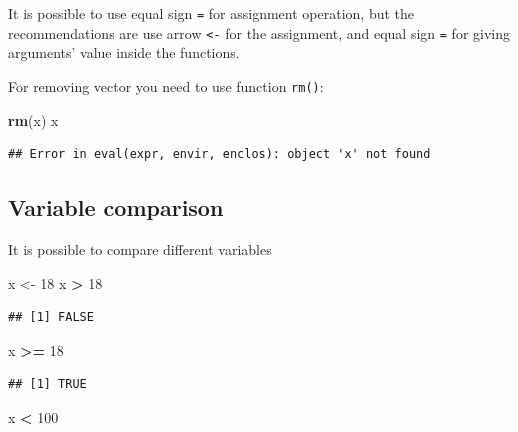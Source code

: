 \documentclass[
]{book}
\newenvironment{Shaded}{\begin{snugshade}}{\end{snugshade}}
\newcommand{\DecValTok}[1]{\textcolor[rgb]{0.00,0.00,0.81}{#1}}
\newcommand{\KeywordTok}[1]{\textcolor[rgb]{0.13,0.29,0.53}{\textbf{#1}}}
\newcommand{\NormalTok}[1]{#1}
\newcommand{\OperatorTok}[1]{\textcolor[rgb]{0.81,0.36,0.00}{\textbf{#1}}}
\newcommand{\StringTok}[1]{\textcolor[rgb]{0.31,0.60,0.02}{#1}}
\begin{document}
It is possible to use equal sign \texttt{=} for assignment operation, but the recommendations are use arrow \texttt{\textless{}-} for the assignment, and equal sign \texttt{=} for giving arguments' value inside the functions.

For removing vector you need to use function \texttt{rm()}:

\begin{Shaded}
\begin{Highlighting}[]
\KeywordTok{rm}\NormalTok{(x)}
\NormalTok{x}
\end{Highlighting}
\end{Shaded}

\begin{verbatim}
## Error in eval(expr, envir, enclos): object 'x' not found
\end{verbatim}

\hypertarget{variable-comparison}{%
\subsection{Variable comparison}\label{variable-comparison}}

It is possible to compare different variables

\begin{Shaded}
\begin{Highlighting}[]
\NormalTok{x <-}\StringTok{ }\DecValTok{18}
\NormalTok{x }\OperatorTok{>}\StringTok{ }\DecValTok{18}
\end{Highlighting}
\end{Shaded}

\begin{verbatim}
## [1] FALSE
\end{verbatim}

\begin{Shaded}
\begin{Highlighting}[]
\NormalTok{x }\OperatorTok{>=}\StringTok{ }\DecValTok{18}
\end{Highlighting}
\end{Shaded}

\begin{verbatim}
## [1] TRUE
\end{verbatim}

\begin{Shaded}
\begin{Highlighting}[]
\NormalTok{x }\OperatorTok{<}\StringTok{ }\DecValTok{100}
\end{Highlighting}
\end{Shaded}
\end{document}
